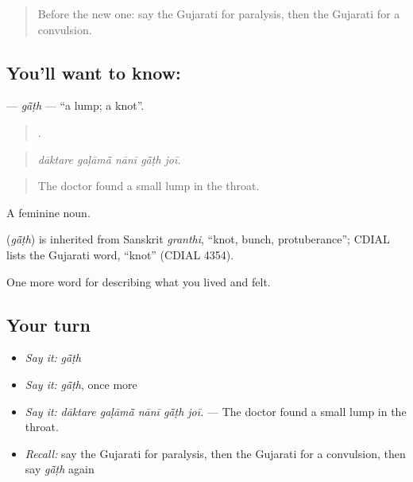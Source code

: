 \label{lesson:GU-C479-gath}



\begin{quote}
Before the new one: say the Gujarati for paralysis, then the Gujarati for a convulsion.
\end{quote}

\subsection*{You'll want to know: }
\textbf{} — \emph{gā̃ṭh} — \textquotedblleft{}a lump; a knot\textquotedblright{}.

\begin{quote}
    .
\end{quote}

\begin{quote}
\emph{dāktare gaḷāmā̃ nānī gā̃ṭh joī.}
\end{quote}

\begin{quote}
The doctor found a small lump in the throat.
\end{quote}

A feminine noun.

\begin{cousinweb}
\textbf{} (\emph{gā̃ṭh}) is inherited from Sanskrit \emph{granthi}, \textquotedblleft{}knot, bunch, protuberance\textquotedblright{}; CDIAL lists the Gujarati word, \textquotedblleft{}knot\textquotedblright{} (CDIAL 4354).
\end{cousinweb}

\begin{grammarlens}[title={What you've built}]
One more word for describing what you lived and felt.
\end{grammarlens}

\subsection*{Your turn}
\begin{itemize}
\raggedright
  \item \emph{Say it:} \emph{gā̃ṭh}
  \item \emph{Say it:} \emph{gā̃ṭh}, once more
  \item \emph{Say it:} \emph{dāktare gaḷāmā̃ nānī gā̃ṭh joī.} — The doctor found a small lump in the throat.
  \item \emph{Recall:} say the Gujarati for paralysis, then the Gujarati for a convulsion, then say \emph{gā̃ṭh} again
\end{itemize}


